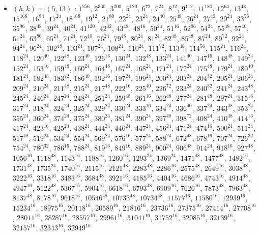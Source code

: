 \begin{itemize}
\item $(h,k)=(5,13)$ : $1^{256}$, $2^{360}$, $3^{200}$, $5^{120}$, $6^{72}$, $7^{24}$, $8^{12}$, $9^{112}$, $11^{180}$, $12^{64}$, $13^{48}$, $15^{168}$, $16^{84}$, $17^{24}$, $18^{168}$, $19^{12}$, $21^{80}$, $22^{24}$, $23^{24}$, $24^{40}$, $25^{48}$, $26^{24}$, $27^{40}$, $29^{24}$, $33^{56}$, $35^{96}$, $38^{48}$, $39^{24}$, $40^{24}$, $41^{120}$, $42^{32}$, $43^{48}$, $48^{16}$, $50^{24}$, $51^{16}$, $52^{96}$, $54^{24}$, $55^{48}$, $57^{40}$, $61^{24}$, $63^{80}$, $65^{24}$, $71^{24}$, $72^{40}$, $76^{24}$, $79^{48}$, $80^{24}$, $81^{24}$, $82^{48}$, $85^{48}$, $87^{24}$, $89^{72}$, $92^{24}$, $94^{24}$, $96^{24}$, $102^{48}$, $103^{24}$, $107^{24}$, $108^{24}$, $110^{24}$, $111^{72}$, $113^{48}$, $114^{56}$, $115^{24}$, $116^{24}$, $118^{24}$, $120^{40}$, $122^{48}$, $123^{40}$, $126^{16}$, $130^{24}$, $132^{48}$, $133^{24}$, $141^{40}$, $147^{16}$, $148^{48}$, $149^{24}$, $152^{24}$, $153^{16}$, $159^{48}$, $160^{24}$, $164^{48}$, $167^{24}$, $168^{24}$, $171^{24}$, $172^{24}$, $175^{48}$, $179^{24}$, $180^{40}$, $181^{24}$, $182^{48}$, $183^{72}$, $186^{40}$, $192^{16}$, $197^{24}$, $199^{24}$, $200^{24}$, $203^{24}$, $204^{32}$, $205^{24}$, $206^{24}$, $209^{24}$, $210^{24}$, $211^{48}$, $215^{24}$, $217^{48}$, $222^{16}$, $225^{40}$, $226^{72}$, $233^{24}$, $240^{32}$, $241^{24}$, $243^{48}$, $245^{24}$, $246^{24}$, $247^{24}$, $248^{24}$, $251^{24}$, $259^{48}$, $261^{16}$, $262^{48}$, $277^{24}$, $281^{48}$, $297^{24}$, $315^{16}$, $317^{24}$, $318^{24}$, $324^{24}$, $325^{24}$, $329^{24}$, $330^{24}$, $333^{16}$, $334^{24}$, $336^{40}$, $337^{24}$, $343^{48}$, $353^{24}$, $355^{24}$, $360^{24}$, $374^{24}$, $375^{24}$, $380^{24}$, $381^{24}$, $390^{24}$, $397^{48}$, $398^{72}$, $408^{24}$, $410^{48}$, $414^{16}$, $417^{24}$, $423^{16}$, $425^{24}$, $438^{24}$, $444^{24}$, $446^{24}$, $447^{24}$, $456^{24}$, $471^{24}$, $474^{16}$, $500^{24}$, $511^{24}$, $517^{48}$, $519^{24}$, $534^{24}$, $554^{24}$, $569^{24}$, $576^{16}$, $577^{24}$, $588^{24}$, $672^{48}$, $678^{16}$, $707^{24}$, $726^{32}$, $754^{24}$, $780^{32}$, $786^{16}$, $788^{24}$, $819^{16}$, $849^{16}$, $889^{24}$, $900^{24}$, $906^{48}$, $914^{24}$, $918^{16}$, $927^{48}$, $1056^{16}$, $1118^{48}$, $1143^{16}$, $1188^{16}$, $1260^{16}$, $1293^{24}$, $1369^{24}$, $1471^{48}$, $1477^{48}$, $1482^{16}$, $1731^{48}$, $1735^{24}$, $1740^{16}$, $2115^{16}$, $2121^{48}$, $2283^{48}$, $2286^{16}$, $2575^{48}$, $2649^{16}$, $3038^{48}$, $3222^{16}$, $3318^{16}$, $3483^{16}$, $3684^{48}$, $3921^{16}$, $4185^{16}$, $4404^{16}$, $4686^{16}$, $4743^{16}$, $4914^{48}$, $4947^{16}$, $5122^{48}$, $5367^{16}$, $5904^{16}$, $6618^{16}$, $6793^{48}$, $6909^{16}$, $7626^{16}$, $7873^{48}$, $7963^{48}$, $8137^{48}$, $8178^{16}$, $9618^{16}$, $10546^{48}$, $10733^{48}$, $10734^{48}$, $11577^{16}$, $11580^{16}$, $12939^{16}$, $15234^{16}$, $18975^{16}$, $20118^{16}$, $20589^{16}$, $21816^{16}$, $23736^{16}$, $27375^{16}$, $27414^{16}$, $27708^{16}$, $28011^{16}$, $28287^{16}$, $28557^{16}$, $29961^{16}$, $31041^{16}$, $31752^{16}$, $32085^{16}$, $32139^{16}$, $32157^{16}$, $32343^{16}$, $32949^{16}$

\end{itemize}
